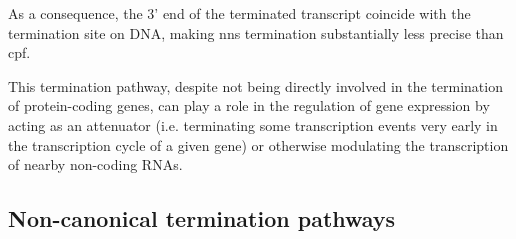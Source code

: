 As a consequence, the 3' end of the terminated transcript coincide with the termination site on DNA, making \gls{nns} termination substantially less precise than \gls{cpf}.

This termination pathway, despite not being directly involved in the termination of protein-coding genes, can play a role in the regulation of gene expression by acting as an attenuator (i.e. terminating some  transcription events very early in the transcription cycle of a given gene) or otherwise modulating the transcription of nearby non-coding RNAs.







\subsection{Non-canonical termination pathways}
